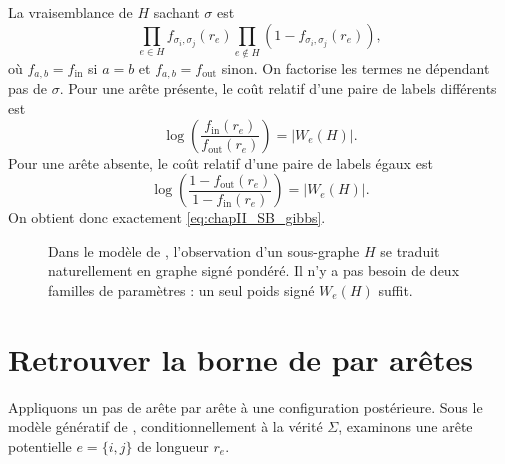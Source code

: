 \begin{Preuve}
La vraisemblance de $H$ sachant $\sigma$ est
\[
    \prod_{e\in H} f_{\sigma_i,\sigma_j}(r_e)
    \prod_{e\notin H}\left(1-f_{\sigma_i,\sigma_j}(r_e)\right),
\]
où $f_{a,b}=f_{\mathrm{in}}$ si $a=b$ et $f_{a,b}=f_{\mathrm{out}}$ sinon. On factorise les termes ne dépendant pas de $\sigma$. Pour une arête présente, le coût relatif d'une paire de labels différents est
\[
    \log\left(\frac{f_{\mathrm{in}}(r_e)}{f_{\mathrm{out}}(r_e)}\right)=|W_e(H)|.
\]
Pour une arête absente, le coût relatif d'une paire de labels égaux est
\[
    \log\left(\frac{1-f_{\mathrm{out}}(r_e)}{1-f_{\mathrm{in}}(r_e)}\right)=|W_e(H)|.
\]
On obtient donc exactement \eqref{eq:chapII_SB_gibbs}.
\end{Preuve}

\begin{figure}[H]
\centering
{}
\caption{Dans le modèle de \SB{}, l'observation d'un sous-graphe $H$ se traduit naturellement en graphe signé pondéré. Il n'y a pas besoin de deux familles de paramètres : un seul poids signé $W_e(H)$ suffit.}
\label{fig:chapII_SB_weights}
\end{figure}

\section{Retrouver la borne de  par  arêtes}
\label{sec:chapII_SB_edges}

Appliquons un pas de \SW{} arête par arête à une configuration postérieure. Sous le modèle génératif de \SB{}, conditionnellement à la vérité $\Sigma$, examinons une arête potentielle $e=\{i,j\}$ de longueur $r_e$.

